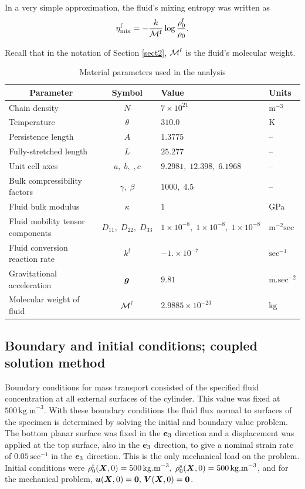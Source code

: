 In a very simple approximation, the fluid's mixing entropy was
written as
\begin{equation}
\eta^\mathrm{f}_\mathrm{mix} =
-\frac{k}{{\mathcal M}^\mathrm{f}}\log\frac{\rho_0^\mathrm{f}}{\rho_0}.
\label{mixentropy}
\end{equation}

\noindent Recall that in the notation of Section \ref{sect2},
${\mathcal M}^\mathrm{f}$ is the fluid's molecular weight.

\begin{table}[ht]
\caption{Material parameters used in the analysis} \label{mattab}
\begin{tabular}{lcll}
\hline
\multicolumn{1}{c}{Parameter} & Symbol & Value & Units\\
\hline
Chain density & $N$ & $7\times 10^{21}$ & $\mathrm{m}^{-3}$\\
Temperature& $\theta$  & $310.0$ & K\\
Persistence length & $A$ & $1.3775$ & --\\
Fully-stretched length & $L$ & $25.277$ & --\\
Unit cell axes & $a,\;b,\;,c$ & $9.2981,\;12.398,\;6.1968$ & --\\
Bulk compressibility factors & $\gamma,\;\beta$ & $1000,\; 4.5$ & --\\
Fluid bulk modulus &$\kappa$ & $1$ & GPa\\
Fluid mobility tensor components& $D_{11},\;D_{22},\;D_{33}$ & $1\times 10^{-8},\;1\times 10^{-8},\;1\times 10^{-8}$ &$\mathrm{m}^{-2}\mathrm{sec}$\\
Fluid conversion reaction rate & $k^\mathrm{f}$ & $-1.\times 10^{-7}$ & $\mathrm{sec}^{-1}$\\
Gravitational acceleration & $\mbox{\boldmath$ g$}$ & $9.81$ & $\mathrm{m}.\mathrm{sec}^{-2}$\\
Molecular weight of fluid &${\mathcal M}^\mathrm{f}$& $2.9885\times 10^{-23}$ & $\mathrm{kg}$\\
\hline
\end{tabular}
\end{table}

\subsection{Boundary and initial conditions; coupled solution method}\label{sect6.2}

Boundary conditions for mass transport consisted of the specified
fluid concentration at all external surfaces of the cylinder. This
value was fixed at $500\,\mathrm{kg.m}^{-3}$. With these boundary
conditions the fluid flux normal to surfaces of the specimen is
determined by solving the initial and boundary value problem. The
bottom planar surface was fixed in the $\mbox{\boldmath$ e$}_3$ direction and a
displacement was applied at the top surface, also in the $\mbox{\boldmath$ e$}_3$
direction, to give a nominal strain rate of
$0.05\,\mathrm{sec}^{-1}$ in the $\mbox{\boldmath$ e$}_3$ direction. This is the
only mechanical load on the problem. Initial conditions were
$\rho_0^\mathrm{f}(\mbox{\boldmath$ X$},0) =
500\,\mathrm{kg.m}^{-3},\;\rho_0^\mathrm{s}(\mbox{\boldmath$ X$},0) =
500\,\mathrm{kg.m}^{-3}$, and for the mechanical problem,
$\mbox{\boldmath$ u$}(\mbox{\boldmath$ X$},0) = {\bf 0},\,\mbox{\boldmath$ V$}(\mbox{\boldmath$ X$},0) = {\bf 0}$.

